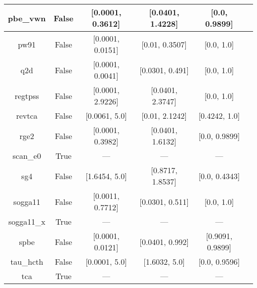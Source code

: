 \begin{tabular}{|c|c|c|c|c|l|}
      pbe\_vwn &                 False & [0.0001, 0.3612] & [0.0401, 1.4228] &    [0.0, 0.9899] & \cite{Kraisler2010_042516,Perdew1996_3865,Perdew1996_3865_err} \\ \hline
          pw91 &                 False & [0.0001, 0.0151] &   [0.01, 0.3507] &       [0.0, 1.0] &          \cite{Perdew1991,Perdew1992_6671,Perdew1992_6671_err} \\ \hline
           q2d &                 False & [0.0001, 0.0041] &  [0.0301, 0.491] &       [0.0, 1.0] &                                       \cite{Chiodo2012_126402} \\ \hline
       regtpss &                 False & [0.0001, 2.9226] & [0.0401, 2.3747] &       [0.0, 1.0] &                                       \cite{Perdew2009_026403} \\ \hline
        revtca &                 False &    [0.0061, 5.0] &   [0.01, 2.1242] &    [0.4242, 1.0] &                                        \cite{Tognetti2008_536} \\ \hline
          rge2 &                 False & [0.0001, 0.3982] & [0.0401, 1.6132] &    [0.0, 0.9899] &                                      \cite{Ruzsinszky2009_763} \\ \hline
      scan\_e0 &                  True &              --- &              --- &              --- &                                          \cite{Sun2015_036402} \\ \hline
           sg4 &                 False &    [1.6454, 5.0] & [0.8717, 1.8537] &    [0.0, 0.4343] &                                   \cite{Constantin2016_045126} \\ \hline
       sogga11 &                 False & [0.0011, 0.7712] &  [0.0301, 0.511] &       [0.0, 1.0] &                                       \cite{Peverati2011_1991} \\ \hline
    sogga11\_x &                  True &              --- &              --- &              --- &                                     \cite{Peverati2011_191102} \\ \hline
          spbe &                 False & [0.0001, 0.0121] &  [0.0401, 0.992] & [0.9091, 0.9899] &                                        \cite{Swart2009_094103} \\ \hline
     tau\_hcth &                 False &    [0.0001, 5.0] &    [1.6032, 5.0] &    [0.0, 0.9596] &                                          \cite{Boese2002_9559} \\ \hline
           tca &                  True &              --- &              --- &              --- &                                     \cite{Tognetti2008_034101} \\ \hline

\end{tabular}
